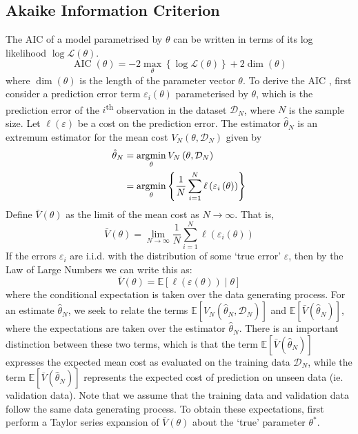 \documentclass[11pt]{report} %
\begin{document}
\subsection{Akaike Information Criterion}

The AIC of a model parametrised by $\theta$ can be written in terms of its log likelihood $\log\mathcal{L}\left(\theta\right)$.
\begin{equation}
\operatorname{AIC}\left(\theta\right) = -2\max_{\theta}\left\{\log\mathcal{L}\left(\theta\right)\right\} + 2\dim\left(\theta\right)
\end{equation}
where $\dim\left(\theta\right)$ is the length of the parameter vector $\theta$. To derive the AIC \cite{Ljung1999}, first consider a prediction error term $\varepsilon_{i}\left(\theta\right)$ parameterised by $\theta$, which is the prediction error of the $i$\textsuperscript{th} observation in the dataset $\mathcal{D}_{N}$, where $N$ is the sample size. Let $\ell\left(\varepsilon\right)$ be a cost on the prediction error. The estimator $\hat{\theta}_{N}$ is an extremum estimator for the mean cost $V_{N}\left(\theta, \mathcal{D}_{N}\right)$ given by
\begin{align}
\hat{\theta}_{N} &= \operatorname*{argmin}_{\theta}V_{N}\left(\theta, \mathcal{D}_{N}\right) \\
&= \operatorname*{argmin}_{\theta}\left\{\dfrac{1}{N}\sum_{i = 1}^{N}\ell\left(\varepsilon_{i}\left(\theta\right)\right)\right\}
\end{align}
Define $\bar{V}\left(\theta\right)$ as the limit of the mean cost as $N\to\infty$. That is,
\begin{equation}
\bar{V}\left(\theta\right) = \lim_{N\to\infty}\dfrac{1}{N}\sum_{i = 1}^{N}\ell\left(\varepsilon_{i}\left(\theta\right)\right)
\end{equation}
If the errors $\varepsilon_{i}$ are i.i.d. with the distribution of some `true error' $\varepsilon$, then by the Law of Large Numbers we can write this as:
\begin{equation}
\bar{V}\left(\theta\right) = \mathbb{E}\left[\ell\left(\varepsilon\left(\theta\right)\right)\middle|\theta\right]
\end{equation}
where the conditional expectation is taken over the data generating process. For an estimate $\hat{\theta}_{N}$, we seek to relate the terms $\mathbb{E}\left[V_{N}\left(\hat{\theta}_{N}, \mathcal{D}_{N}\right)\right]$ and $\mathbb{E}\left[\bar{V}\left(\hat{\theta}_{N}\right)\right]$, where the expectations are taken over the estimator $\hat{\theta}_{N}$. There is an important distinction between these two terms, which is that the term $\mathbb{E}\left[\bar{V}\left(\hat{\theta}_{N}\right)\right]$ expresses the expected mean cost as evaluated on the training data $\mathcal{D}_{N}$, while the term $\mathbb{E}\left[\bar{V}\left(\hat{\theta}_{N}\right)\right]$ represents the expected cost of prediction on unseen data (ie. validation data). Note that we assume that the training data and validation data follow the same data generating process. To obtain these expectations, first perform a Taylor series expansion of $\bar{V}\left(\theta\right)$ about the `true' parameter $\theta^{*}$.
\end{document}
